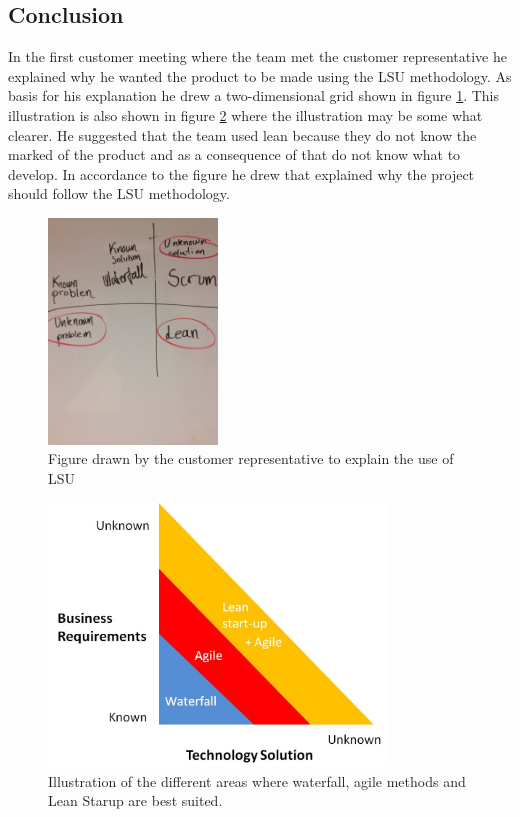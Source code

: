 \subsection{Conclusion}
In the first customer meeting where the team met the customer representative he explained why he wanted the product to be made using the \gls{LSU} methodology. As basis for his explanation he drew a two-dimensional grid shown in figure \ref{fig:lean-scrum-waterfall}. This illustration is also shown in figure \ref{fig:lean-scrum-waterfall2} where the illustration may be some what clearer.
He suggested that the team used lean because they do not know the marked of the product and as a consequence of that do not know what to develop. In accordance to the figure he drew that explained why the project should follow the \gls{LSU} methodology.

\begin{figure}
\centering
\includegraphics[height=6cm, angle =-90]{figs/lean-scrum-waterfall.JPG}
\caption{Figure drawn by the customer representative to explain the use of \gls{LSU}}
\label{fig:lean-scrum-waterfall}
\end{figure}

\begin{figure}
\centering
\includegraphics[height=7cm]{figs/lean-vs-other.jpg}
\caption{Illustration of the different areas where waterfall, agile methods and Lean Starup are best suited.}
\label{fig:lean-scrum-waterfall2}
\end{figure}

